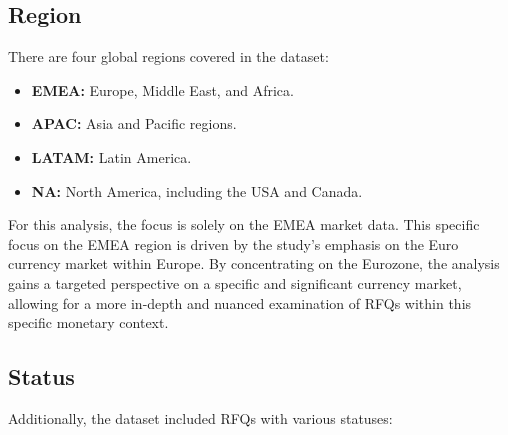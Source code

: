 \subsection{Region}
There are four global regions covered in the dataset:

\begin{itemize}
    \item \textbf{EMEA:} Europe, Middle East, and Africa.
    \item \textbf{APAC:} Asia and Pacific regions.
    \item \textbf{LATAM:} Latin America.
    \item \textbf{NA:} North America, including the USA and Canada.
\end{itemize}

For this analysis, the focus is solely on the EMEA market data. This specific focus on the EMEA region is driven by the study's emphasis on the Euro currency market within Europe. By concentrating on the Eurozone, the analysis gains a targeted perspective on a specific and significant currency market, allowing for a more in-depth and nuanced examination of RFQs within this specific monetary context.

\subsection{Status}
Additionally, the dataset included RFQs with various statuses:

